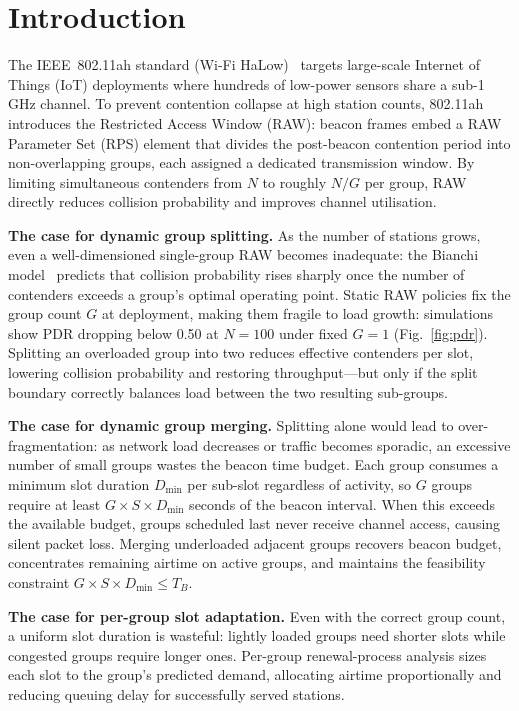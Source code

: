 \documentclass[conference]{IEEEtran}
\begin{document}
\section{Introduction}
\label{sec:intro}

The IEEE~802.11ah standard (Wi-Fi HaLow)~\cite{std80211ah} targets
large-scale Internet of Things (IoT) deployments where hundreds of
low-power sensors share a sub-1\,GHz channel.
To prevent contention collapse at high station counts, 802.11ah introduces
the Restricted Access Window (RAW): beacon frames embed a RAW Parameter
Set (RPS) element that divides the post-beacon contention period into
non-overlapping groups, each assigned a dedicated transmission window.
By limiting simultaneous contenders from $N$ to roughly $N/G$ per group,
RAW directly reduces collision probability and improves channel utilisation.

\textbf{The case for dynamic group splitting.}
As the number of stations grows, even a well-dimensioned single-group RAW
becomes inadequate: the Bianchi model~\cite{bianchi2000} predicts that
collision probability rises sharply once the number of contenders exceeds
a group's optimal operating point.
Static RAW policies fix the group count $G$ at deployment, making them
fragile to load growth: simulations show PDR dropping below 0.50 at
$N\!=\!100$ under fixed $G\!=\!1$ (Fig.~\ref{fig:pdr}).
Splitting an overloaded group into two reduces effective contenders per
slot, lowering collision probability and restoring throughput---but only
if the split boundary correctly balances load between the two resulting
sub-groups.

\textbf{The case for dynamic group merging.}
Splitting alone would lead to over-fragmentation: as network load decreases
or traffic becomes sporadic, an excessive number of small groups wastes
the beacon time budget.
Each group consumes a minimum slot duration $D_\mathrm{min}$ per sub-slot
regardless of activity, so $G$ groups require at least $G \times S \times
D_\mathrm{min}$ seconds of the beacon interval.
When this exceeds the available budget, groups scheduled last never receive
channel access, causing silent packet loss.
Merging underloaded adjacent groups recovers beacon budget, concentrates
remaining airtime on active groups, and maintains the feasibility
constraint $G \times S \times D_\mathrm{min} \leq T_B$.

\textbf{The case for per-group slot adaptation.}
Even with the correct group count, a uniform slot duration is wasteful:
lightly loaded groups need shorter slots while congested groups require
longer ones.
Per-group renewal-process analysis sizes each slot to the group's predicted
demand, allocating airtime proportionally and reducing queuing delay for
successfully served stations.
\end{document}
